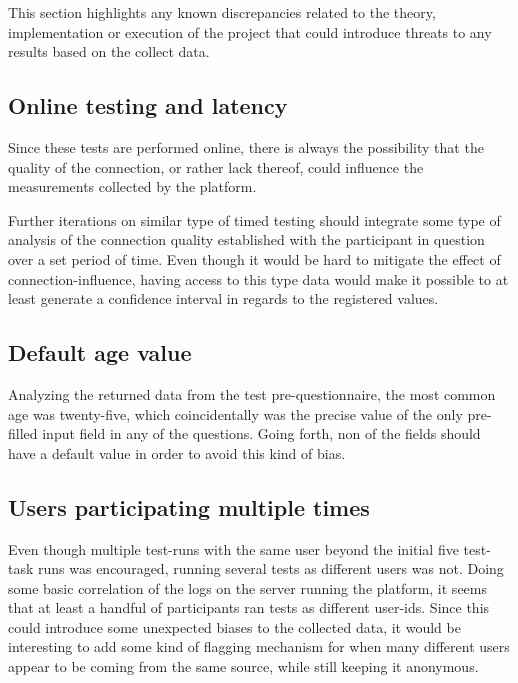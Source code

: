   This section highlights any known discrepancies related to the theory,
  implementation or execution of the project that could introduce threats to
  any results based on the collect data.

  \subsection{Online testing and latency}

  Since these tests are performed online, there is always the possibility that
  the quality of the connection, or rather lack thereof, could influence the
  measurements collected by the platform.

  Further iterations on similar type of timed testing should integrate some
  type of analysis of the connection quality established with the participant
  in question over a set period of time. Even though it would be hard to
  mitigate the effect of connection-influence, having access to this type data
  would make it possible to at least generate a confidence interval in regards
  to the registered values.

%
%
%

  \subsection{Default age value}\label{label_validity_default_age}


  Analyzing the returned data from the test pre-questionnaire, the most common
  age was twenty-five, which coincidentally was the precise value of the only
  pre-filled input field in any of the questions. Going forth, non of the
  fields should have a default value in order to avoid this kind of bias.


  \subsection{Users participating multiple times}

  Even though multiple test-runs with the same user beyond the initial five
  test-task runs was encouraged, running several tests as different users was
  not. Doing some basic correlation of the logs on the server running the
  platform, it seems that at least a handful of participants ran tests as
  different user-ids. Since this could introduce some unexpected biases to the
  collected data, it would be interesting to add some kind of flagging
  mechanism for when many different users appear to be coming from the same
  source, while still keeping it anonymous.
